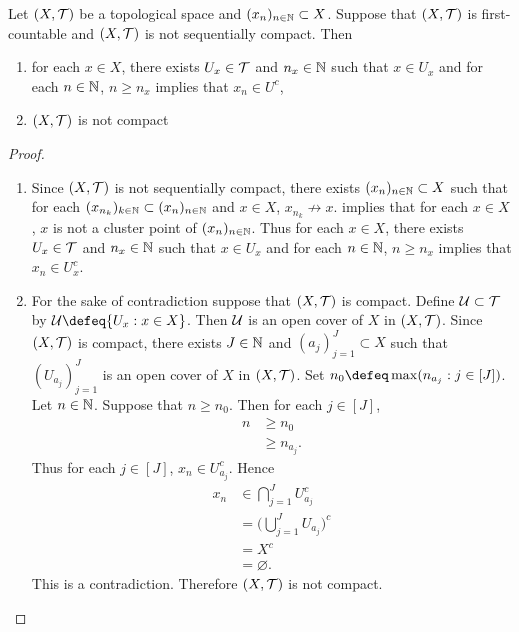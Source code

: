 \documentclass{book}
\begin{document}
\begin{ex} 
	Let $(X, \mathcal{T})$ be a topological space and $(x_n)_{n \in \mathbb{N}} \subset X$. Suppose that $(X, \mathcal{T})$ is first-countable and $(X, \mathcal{T})$ is not sequentially compact. Then
	\begin{enumerate}
		\item for each $x \in X$, there exists $U_x \in \mathcal{T}$ and $n_x \in \mathbb{N}$ such that $x \in U_x$ and for each $n \in \mathbb{N}$, $n \geq n_x$ implies that $x_n \in U^c$, \\
		 
		\item $(X, \mathcal{T})$ is not compact
	\end{enumerate}
\end{ex}

\begin{proof}\
	\begin{enumerate}
		\item Since $(X, \mathcal{T})$ is not sequentially compact, there exists $(x_n)_{n \in \mathbb{N}} \subset X$ such that for each $(x_{n_k})_{k \in \mathbb{N}} \subset (x_n)_{n \in \mathbb{N}}$ and $x \in X$, $x_{n_k} \not \rightarrow x$.  implies that for each $x \in X$, $x$ is not a cluster point of $(x_n)_{n \in \mathbb{N}}$. Thus for each $x \in X$, there exists $U_x \in \mathcal{T}$ and $n_x \in \mathbb{N}$ such that $x \in U_x$ and for each $n \in \mathbb{N}$, $n \geq n_x$ implies that $x_n \in U_x^c$. 
		\item For the sake of contradiction suppose that $(X, \mathcal{T})$ is compact. Define $\mathcal{U} \subset \mathcal{T}$ by $\MU \defeq \{ U_x: x \in X\}$. Then $\mathcal{U}$ is an open cover of $X$ in $(X, \mathcal{T})$. Since $(X, \mathcal{T})$ is compact, there exists $J \in \mathbb{N}$ and $(a_j)_{j = 1}^J \subset X$ such that $(U_{a_j})_{j=1}^J$ is an open cover of $X$ in $(X, \mathcal{T})$. Set $n_0 \defeq \max(n_{a_j}: j \in [J])$. Let $n \in \mathbb{N}$. Suppose that $n \geq n_0$. Then for each $j \in [J]$, 
		\begin{align*}
			n 
			& \geq n_0 \\
			& \geq n_{a_j}.
		\end{align*}
		Thus for each $j \in [J]$, $x_n \in U_{a_j}^c$. Hence 
		\begin{align*}
			x_n 
			& \in \bigcap\limits_{j=1}^J U_{a_j}^c \\
			& = \bigg( \bigcup\limits_{j=1}^J U_{a_j} \bigg)^c \\
			& = X^c \\
			& = \varnothing.
		\end{align*}
		This is a contradiction. Therefore $(X, \mathcal{T})$ is not compact.
	\end{enumerate}
\end{proof}
 
\end{document}
